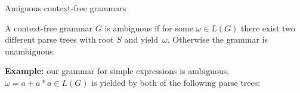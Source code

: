 \documentclass[handout]{beamer}
\begin{document}
\begin{frame}{Amiguous context-free grammars}

	A context-free grammar $G$ is \alert{ambiguous} if for some $\omega\in L(G)$ there exist two different parse trees with root $S$ and yield~$\omega$. Otherwise the grammar is \alert{unambiguous}.
	
	\bigskip

	\textbf{Example:} our grammar for simple expressions is ambiguous, $\omega=a+a*a\in L(G)$ is yielded by both of the following parse trees:

	\begin{center}
	\end{center}	

\end{frame}
\end{document}
